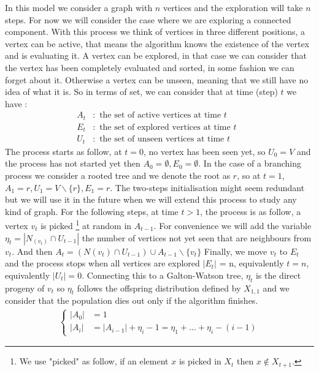In this model we consider a graph with $n$ vertices and the exploration will take $n$ steps. 
For now we will consider the case where we are exploring a connected component.
With this process we think of vertices in three different positions, a vertex can be active, that means the algorithm knows the existence of the vertex and is evaluating it.
A vertex can be explored, in that case we can consider that the vertex has been completely evaluated and sorted, in some fashion we can forget about it.
Otherwise a vertex can be unseen, meaning that we still have no idea of what it is.
So in terms of set, we can consider that at time (step) $t$ we have :
\begin{align}
	A_t&: \text{ the set of active vertices at time $t$ } \\
	E_t&: \text{ the set of explored vertices at time $t$ } \\
	U_t&: \text{ the set of unseen vertices at time $t$ } 
\end{align}
The process starts as follow, at $t = 0$, no vertex has been seen yet, so $U_0 = V$ and the process has not started yet then $A_0 = \emptyset, E_0=\emptyset$.
In the case of a branching process we consider a rooted tree and we denote the root as $r$, so at $t = 1$, $A_1 = r, U_1 = V\backslash\{r\}, E_1 = r$.
The two-steps initialisation might seem redundant but we will use it in the future when we will extend this process to study any kind of graph. 
\newline
For the following steps, at time $t > 1$, the process is as follow, a vertex $v_t$ is picked \footnote{We use "picked" as follow, if an element $x$ is picked in  $X_{t}$ then $x \not\in X_{t+1}$.} at random in $A_{t-1}$. 
For convenience we will add the variable $\eta_t = |N_(v_t) \cap U_{t-1}|$ the number of vertices not yet seen that are neighbours from $v_t$.
And then $A_t = (N(v_t)\cap U_{t-1} ) \cup A_{t-1} \backslash \{v_t\}$
Finally, we move $v_t$ to $E_t$ and the process stops when all vertices are explored $|E_t|$ = n, equivalently $t=n$, equivalently $|U_t| = 0$.
\newline
Connecting this to a Galton-Watson tree, $\eta_t$ is the direct progeny of $v_t$ so $\eta_t$ follows the offspring distribution defined by $X_{1, 1}$ and we consider that the population dies out only if the algorithm finishes.
\begin{align}\label{activatedV}
	\left\{\begin{array}{rl}
			|A_0| &= 1\\
			|A_i| &= |A_{i-1}| + \eta_i - 1 = \eta_1 + ... + \eta_i - ( i - 1)
	 \end{array}
	\right.
\end{align}
